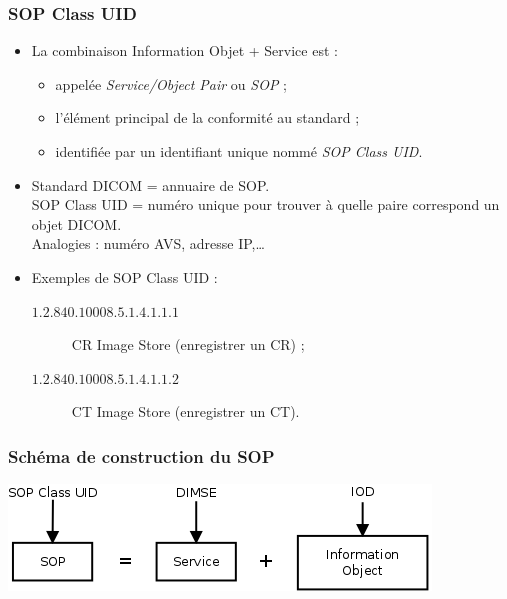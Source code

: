 	\frame
	{
		\frametitle{SOP Class UID}

		\begin{itemize}
			\item La combinaison Information Objet + Service est :
			\begin{itemize}
				\item appel\'ee \emph{Service/Object Pair} ou \emph{SOP} ;
				\item l'\'el\'ement principal de la conformit\'e au standard ;
				\item identifi\'ee par un identifiant unique nomm\'e \emph{SOP Class UID}.
			\end{itemize}
		
			\item Standard DICOM = annuaire de SOP.\\
			SOP Class UID = num\'ero unique pour trouver \`a quelle paire correspond un objet DICOM.\\
			Analogies : num\'ero AVS, adresse IP,\ldots

			\item Exemples de SOP Class UID :
			\begin{description}
				\item[$1.2.840.10008.5.1.4.1.1.1$] CR Image Store (enregistrer un CR) ;
				\item[$1.2.840.10008.5.1.4.1.1.2$] CT Image Store (enregistrer un CT).
			\end{description}
		\end{itemize}
	}
	
	\frame
	{
		\frametitle{Sch\'ema de construction du SOP}
		\begin{center}
			\includegraphics[width=\linewidth]{./figures/sop-definition.png}
		\end{center}		
	}

